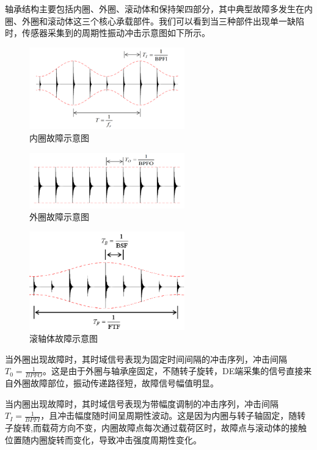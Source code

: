 \documentclass[a4paper]{CPIPC}
\numberwithin{equation}{section}
\begin{document}
轴承结构主要包括内圈、外圈、滚动体和保持架四部分，其中典型故障多发生在内圈、外圈和滚动体这三个核心承载部件。我们可以看到当三种部件出现单一缺陷时，传感器采集到的周期性振动冲击示意图如下所示。
\begin{figure}[H]
  \centering
  \includegraphics[width=0.6\textwidth]{内圈故障示意图.png}
  \caption{内圈故障示意图}
  \label{fig:confidence}
\end{figure}\begin{figure}[H]
  \centering
  \includegraphics[width=0.6\textwidth]{外圈故障示意图.png}
  \caption{外圈故障示意图}
  \label{fig:confidence}
\end{figure}\begin{figure}[H]
  \centering
  \includegraphics[width=0.6\textwidth]{滚轴体故障示意图.png}
  \caption{滚轴体故障示意图}
  \label{fig:confidence}
\end{figure}
当外圈出现故障时，其时域信号表现为固定时间间隔的冲击序列，冲击间隔${T_0} =  \tfrac{1}{BPFO}$。这是由于外圈与轴承座固定，不随转子旋转，DE端采集的信号直接来自外圈故障部位，振动传递路径短，故障信号幅值明显。

当内圈出现故障时，其时域信号表现为带幅度调制的冲击序列，冲击间隔${T_I} =  \tfrac{1}{BPFI}$，且冲击幅度随时间呈周期性波动。这是因为内圈与转子轴固定，随转子旋转,而载荷方向不变，内圈故障点每次通过载荷区时，故障点与滚动体的接触位置随内圈旋转而变化，导致冲击强度周期性变化。
\end{document}
